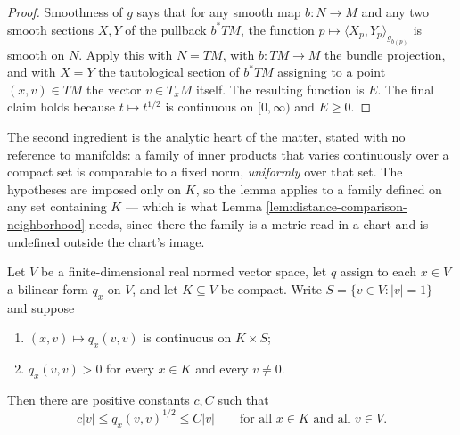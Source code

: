 \begin{proof}
\leanok
{}
Smoothness of $g$ says that for any smooth map $b : N \to M$ and any two smooth sections
$X, Y$ of the pullback $b^*TM$, the function $p \mapsto \langle X_p, Y_p \rangle_{g_{b(p)}}$ is
smooth on $N$. Apply this with $N = TM$, with $b : TM \to M$ the bundle projection, and with
$X = Y$ the tautological section of $b^*TM$ assigning to a point $(x,v) \in TM$ the vector
$v \in T_x M$ itself. The resulting function is $E$. The final claim holds because
$t \mapsto t^{1/2}$ is continuous on $[0,\infty)$ and $E \geq 0$.
\end{proof}

The second ingredient is the analytic heart of the matter, stated with no reference to
manifolds: a family of inner products that varies continuously over a compact set is
comparable to a fixed norm, \emph{uniformly} over that set. The hypotheses are imposed only
on $K$, so the lemma applies to a family defined on any set containing $K$ --- which is what
Lemma \ref{lem:distance-comparison-neighborhood} needs, since there the family is a metric
read in a chart and is undefined outside the chart's image.

\begin{lemma}
\label{lem:norm-comparison-compact-core}
\leanok
Let $V$ be a finite-dimensional real normed vector space, let $q$ assign to each $x \in V$ a
bilinear form $q_x$ on $V$, and let $K \subseteq V$ be compact. Write $S = \{v \in V : |v| = 1\}$
and suppose
\begin{enumerate}
\item[(i)] $(x,v) \mapsto q_x(v,v)$ is continuous on $K \times S$;
\item[(ii)] $q_x(v,v) > 0$ for every $x \in K$ and every $v \neq 0$.
\end{enumerate}
Then there are positive constants $c, C$ such that
\[
c|v| \leq q_x(v,v)^{1/2} \leq C|v| \qquad \text{for all } x \in K \text{ and all } v \in V.
\]
\end{lemma}

